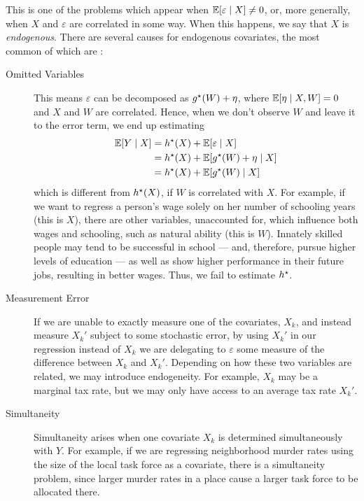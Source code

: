This is one of the problems which appear when $ \mathbb{E} [ \varepsilon \mid X ] \neq 0 $, or, more generally, when $ X $ and $ \varepsilon $ are correlated in some way.
When this happens, we say that $ X $ is \emph{endogenous}.
There are several causes for endogenous covariates, the most common of  which are \cite{wooldridge2001}:
\begin{description}
    \item[Omitted Variables] This means $ \varepsilon $ can be decomposed as $ g^{ \star } ( W ) + \eta $, where $ \mathbb{E} [ \eta \mid X, W ] = 0 $ and $ X $ and $ W $ are correlated.
        Hence, when we don't observe $ W $ and leave it to the error term, we end up estimating
        \begin{align*}
            \mathbb{E} [ Y \mid X ]
            &= h^{ \star } ( X ) + \mathbb{E} [ \varepsilon \mid X ] \\
            &= h^{ \star } ( X ) + \mathbb{E} [ g^{ \star } ( W ) + \eta \mid X ] \\
            &= h^{ \star } ( X ) + \mathbb{E} [ g^{ \star } ( W ) \mid X ] \\
        \end{align*}
        which is different from $ h^{ \star } ( X ) $, if $ W $ is correlated with $ X $.
        For example, if we want to regress a person's wage solely on her number of schooling years (this is $ X $), there are other variables, unaccounted for, which influence both wages and schooling, such as natural ability (this is $ W $).
        Innately skilled people may tend to be successful in school --- and, therefore, pursue higher levels of education --- as well as show higher performance in their future jobs, resulting in better wages.
        Thus, we fail to estimate $ h^{ \star } $.
    \item[Measurement Error] If we are unable to exactly measure one of the covariates, $ X_{ k } $, and instead measure $ X_{ k }' $ subject to some stochastic error, by using $ X_{ k }' $ in our regression instead of $ X_{ k } $ we are delegating to $ \varepsilon $ some measure of the difference between $ X_{ k } $ and $ X_{ k }' $.
        Depending on how these two variables are related, we may introduce endogeneity.
        For example, $ X_{ k } $ may be a marginal tax rate, but we may only have access to an average tax rate $ X_{ k }' $.
    \item[Simultaneity] Simultaneity arises when one covariate $ X_{ k } $ is determined simultaneously with $ Y $.
        For example, if we are regressing neighborhood murder rates using the size of the local task force as a covariate, there is a simultaneity problem, since larger murder rates in a place cause a larger task force to be allocated there.
\end{description}

